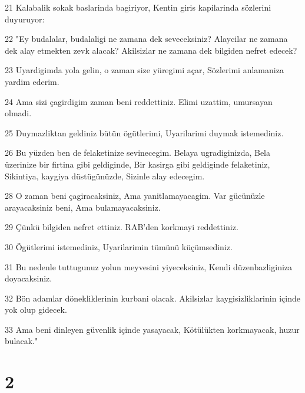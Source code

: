 \par 21 Kalabalik sokak baslarinda bagiriyor, Kentin giris kapilarinda sözlerini duyuruyor:
\par 22 "Ey budalalar, budalaligi ne zamana dek seveceksiniz? Alaycilar ne zamana dek alay etmekten zevk alacak? Akilsizlar ne zamana dek bilgiden nefret edecek?
\par 23 Uyardigimda yola gelin, o zaman size yüregimi açar, Sözlerimi anlamaniza yardim ederim.
\par 24 Ama sizi çagirdigim zaman beni reddettiniz. Elimi uzattim, umursayan olmadi.
\par 25 Duymazliktan geldiniz bütün ögütlerimi, Uyarilarimi duymak istemediniz.
\par 26 Bu yüzden ben de felaketinize sevinecegim. Belaya ugradiginizda, Bela üzerinize bir firtina gibi geldiginde, Bir kasirga gibi geldiginde felaketiniz, Sikintiya, kaygiya düstügünüzde, Sizinle alay edecegim.
\par 28 O zaman beni çagiracaksiniz, Ama yanitlamayacagim. Var gücünüzle arayacaksiniz beni, Ama bulamayacaksiniz.
\par 29 Çünkü bilgiden nefret ettiniz. RAB'den korkmayi reddettiniz.
\par 30 Ögütlerimi istemediniz, Uyarilarimin tümünü küçümsediniz.
\par 31 Bu nedenle tuttugunuz yolun meyvesini yiyeceksiniz, Kendi düzenbazliginiza doyacaksiniz.
\par 32 Bön adamlar dönekliklerinin kurbani olacak. Akilsizlar kaygisizliklarinin içinde yok olup gidecek.
\par 33 Ama beni dinleyen güvenlik içinde yasayacak, Kötülükten korkmayacak, huzur bulacak."

\chapter{2}

